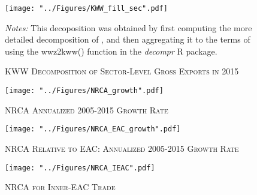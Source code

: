 \documentclass[a4paper]{article}
\begin{document}
\begin{figure}[h!] 
\centering
\caption{\label{fig:KWW_fill_sec}\textsc{KWW Decomposition of Sector-Level Gross Exports in 2015}}
\texttt{[image: "../Figures/KWW\_fill\_sec".pdf]} %
\raggedright
\scriptsize
\emph{Notes:} This decoposition was obtained by first computing the more detailed decomposition of \citet{wang2013quantifying}, and then aggregating it to the terms of \citet{koopman2014tracing} using the wwz2kww() function in the \emph{decompr} R package.
\end{figure}
\FloatBarrier

\begin{figure}[h!] %
\centering
\caption{\label{fig:NRCA_growth}\textsc{NRCA Annualized 2005-2015 Growth Rate}}
\texttt{[image: "../Figures/NRCA\_growth".pdf]} %
\end{figure}
\FloatBarrier


\begin{figure}[h!]
\centering
\caption{\label{fig:NRCA_EAC_growth}\textsc{NRCA Relative to EAC: Annualized 2005-2015 Growth Rate}}
\texttt{[image: "../Figures/NRCA\_EAC\_growth".pdf]} %
\end{figure}
\FloatBarrier


\begin{figure}[h!] \vspace{-2mm}
\centering
\caption{\label{fig:NRCA_IEAC}\textsc{NRCA for Inner-EAC Trade}}
\texttt{[image: "../Figures/NRCA\_IEAC".pdf]} %
\end{figure}
\FloatBarrier
\end{document}
